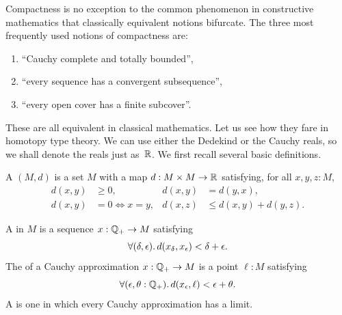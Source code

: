 Compactness is no exception to the common phenomenon in constructive mathematics that
classically equivalent notions bifurcate. The three most frequently used notions of
compactness are:
%
%
\begin{enumerate}
\item {} ``Cauchy complete and totally bounded'',
\item {} ``every sequence has a convergent subsequence'',
\item {} ``every open cover has a finite subcover''.
\end{enumerate}
%
These are all equivalent in classical mathematics.
Let us see how they fare in homotopy type theory. We can use either the Dedekind or the
Cauchy reals, so we shall denote the reals just as~$\mathbb{R}$. We first recall several basic
definitions.

%

\begin{defn} \label{defn:metric-space}
  A 
  $(M, d)$ is a set $M$ with a map $d : M \times M \to \mathbb{R}$
  satisfying, for all $x, y, z : M$,
  \begin{align*}
    d(x,y) &\geq 0, &
    d(x,y) &= d(y,x), \\
    d(x,y) &= 0 \Leftrightarrow x = y, &
    d(x,z) &\leq d(x,y) + d(y,z).
  \end{align*}
\end{defn}

\begin{defn} \label{defn:complete-metric-space}
  A 
  in $M$ is a sequence $x : \mathbb{Q}_{+} \to M$ satisfying
  \begin{equation*}
    \fall{\delta, \epsilon} d(x_\delta, x_\epsilon) < \delta + \epsilon.
  \end{equation*}
  The  of a Cauchy approximation $x : \mathbb{Q}_{+} \to M$ is a point $\ell : M$
  satisfying
  \begin{equation*}
    \fall{\epsilon, \theta : \Qp} d(x_\epsilon, \ell) < \epsilon + \theta.
  \end{equation*}
  A  is one in which every Cauchy approximation has a limit.
\end{defn}

